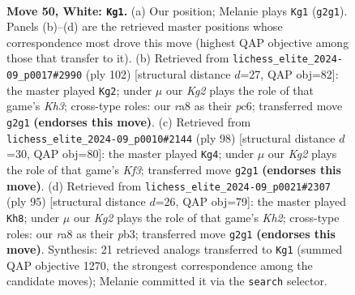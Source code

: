 \documentclass[11pt]{article}
\begin{document}
\clearpage

\begin{figure}[p]\centering
\begin{subfigure}{0.46\textwidth}\centering
\resizebox{\linewidth}{!}{%
\newchessgame
\chessboard[
  setfen={r7/1Q6/4kp2/3p4/4qP2/p5P1/P5KP/8 w - - 19 50},
  showmover=false,
  pgfstyle=straightmove, color=movearrow, markmove={g2-g1}
]}
\caption{}
\end{subfigure}\hfill
\begin{subfigure}{0.46\textwidth}\centering
\resizebox{\linewidth}{!}{%
\newchessgame
\chessboard[
  setfen={8/1Q4pk/1Pp4p/5q2/p6P/P4PPK/8/8 w - - 7 52},
  showmover=false,
  pgfstyle=straightmove, color=movearrow, markmove={h3-g2}
]}
\caption{}
\end{subfigure}
\\[4pt]
\begin{subfigure}{0.46\textwidth}\centering
\resizebox{\linewidth}{!}{%
\newchessgame
\chessboard[
  setfen={8/3PQp1k/6p1/3q4/5P2/5KP1/p7/8 w - - 4 50},
  showmover=false,
  pgfstyle=straightmove, color=movearrow, markmove={f3-g4}
]}
\caption{}
\end{subfigure}\hfill
\begin{subfigure}{0.46\textwidth}\centering
\resizebox{\linewidth}{!}{%
\newchessgame
\chessboard[
  setfen={8/6pk/7p/3p1Q2/1p5P/pP4P1/q4P1K/8 b - - 7 48},
  showmover=false,
  pgfstyle=straightmove, color=movearrow, markmove={h7-h8}
]}
\caption{}
\end{subfigure}
\caption{\textbf{Move 50, White: \texttt{Kg1}.} (a) Our position; Melanie plays \texttt{Kg1} (\texttt{g2g1}). Panels (b)--(d) are the retrieved master positions whose correspondence most drove this move (highest QAP objective among those that transfer to it). (b) Retrieved from \texttt{lichess\_elite\_2024-09\_p0017\#2990} (ply 102) [structural distance $d$=27, QAP obj=82]: the master played \texttt{Kg2}; under $\mu$ our \emph{Kg2} plays the role of that game's \emph{Kh3}; cross-type roles: our \emph{r}a8 as their \emph{p}c6; transferred move \texttt{g2g1} \textbf{(endorses this move)}. (c) Retrieved from \texttt{lichess\_elite\_2024-09\_p0010\#2144} (ply 98) [structural distance $d$=30, QAP obj=80]: the master played \texttt{Kg4}; under $\mu$ our \emph{Kg2} plays the role of that game's \emph{Kf3}; transferred move \texttt{g2g1} \textbf{(endorses this move)}. (d) Retrieved from \texttt{lichess\_elite\_2024-09\_p0021\#2307} (ply 95) [structural distance $d$=26, QAP obj=79]: the master played \texttt{Kh8}; under $\mu$ our \emph{Kg2} plays the role of that game's \emph{Kh2}; cross-type roles: our \emph{r}a8 as their \emph{p}b3; transferred move \texttt{g2g1} \textbf{(endorses this move)}. Synthesis: 21 retrieved analogs transferred to \texttt{Kg1} (summed QAP objective 1270, the strongest correspondence among the candidate moves); Melanie committed it via the \texttt{search} selector.}
\label{fig:thought-m98}
\end{figure}
\end{document}
